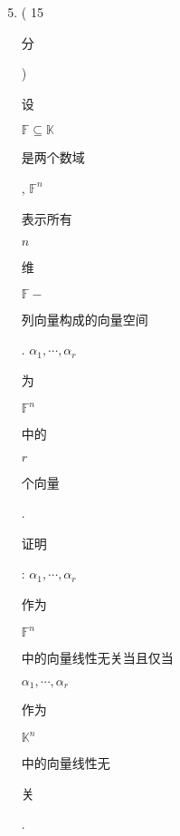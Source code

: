 \documentclass[10pt]{article}
\begin{document}
\begin{enumerate}
  \setcounter{enumi}{4}
  \item ( 15 \begin{CJK}{UTF8}{mj}分\end{CJK}) \begin{CJK}{UTF8}{mj}设\end{CJK} $\mathbb{F} \subseteq \mathbb{K}$ \begin{CJK}{UTF8}{mj}是两个数域\end{CJK}, $\mathbb{F}^{n}$ \begin{CJK}{UTF8}{mj}表示所有\end{CJK} $n$ \begin{CJK}{UTF8}{mj}维\end{CJK} $\mathbb{F}-$ \begin{CJK}{UTF8}{mj}列向量构成的向量空间\end{CJK}. $\alpha_{1}, \cdots, \alpha_{r}$ \begin{CJK}{UTF8}{mj}为\end{CJK} $\mathbb{F}^{n}$ \begin{CJK}{UTF8}{mj}中的\end{CJK} $r$ \begin{CJK}{UTF8}{mj}个向量\end{CJK}. \begin{CJK}{UTF8}{mj}证明\end{CJK}: $\alpha_{1}, \cdots, \alpha_{r}$ \begin{CJK}{UTF8}{mj}作为\end{CJK} $\mathbb{F}^{n}$ \begin{CJK}{UTF8}{mj}中的向量线性无关当且仅当\end{CJK} $\alpha_{1}, \cdots, \alpha_{r}$ \begin{CJK}{UTF8}{mj}作为\end{CJK} $\mathbb{K}^{n}$ \begin{CJK}{UTF8}{mj}中的向量线性无\end{CJK} \begin{CJK}{UTF8}{mj}关\end{CJK}.


\end{enumerate}
\end{document}
